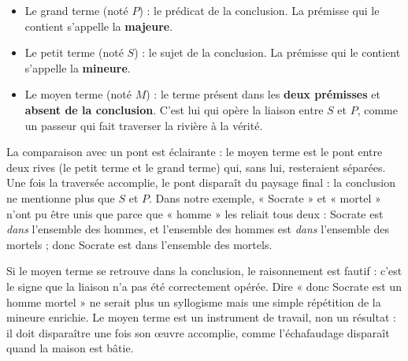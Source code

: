 \documentclass[11pt]{article}
\newcommand{\cle}[1]{{\popxbold\color{popdark}#1}}
\begin{document}
\begin{definition}
\begin{itemize}
\item Le \cle{grand terme} (noté $P$) : le prédicat de la conclusion. La prémisse qui le contient s'appelle la \textbf{majeure}.
\item Le \cle{petit terme} (noté $S$) : le sujet de la conclusion. La prémisse qui le contient s'appelle la \textbf{mineure}.
\item Le \cle{moyen terme} (noté $M$) : le terme présent dans les \textbf{deux prémisses} et \textbf{absent de la conclusion}. C'est lui qui opère la liaison entre $S$ et $P$, comme un passeur qui fait traverser la rivière à la vérité.
\end{itemize}
\end{definition}

La comparaison avec un pont est éclairante : le moyen terme est le pont entre deux rives (le petit terme et le grand terme) qui, sans lui, resteraient séparées. Une fois la traversée accomplie, le pont disparaît du paysage final : la conclusion ne mentionne plus que $S$ et $P$. Dans notre exemple, « Socrate » et « mortel » n'ont pu être unis que parce que « homme » les reliait tous deux : Socrate est \emph{dans} l'ensemble des hommes, et l'ensemble des hommes est \emph{dans} l'ensemble des mortels ; donc Socrate est dans l'ensemble des mortels.

\begin{attention}
Si le moyen terme se retrouve dans la conclusion, le raisonnement est fautif : c'est le signe que la liaison n'a pas été correctement opérée. Dire « donc Socrate est un homme mortel » ne serait plus un syllogisme mais une simple répétition de la mineure enrichie. Le moyen terme est un instrument de travail, non un résultat : il doit disparaître une fois son œuvre accomplie, comme l'échafaudage disparaît quand la maison est bâtie.
\end{attention}
\end{document}
